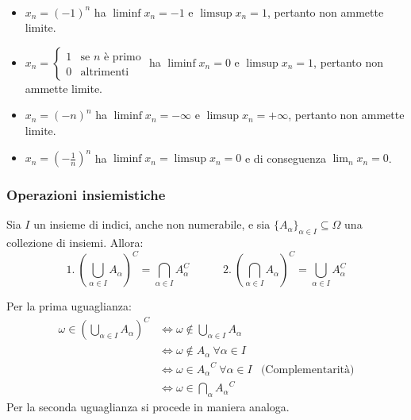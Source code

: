 \begin{ese}~\\[-12pt]
	\begin{itemize}	
		\item $x_n = (-1)^n $ ha $ \liminf x_n = -1$ e $ \limsup x_n = 1$, pertanto non ammette limite.
		\item $x_n = \begin{cases}
		1 & \text{se } n \text{ è primo} \\
		0 & \text{altrimenti}
		\end{cases}$ ha $ \liminf x_n = 0$ e $ \limsup x_n = 1$, pertanto non ammette limite.
		\item $x_n = (-n)^n $ ha $ \liminf x_n = -\infty$ e $ \limsup x_n = +\infty$, pertanto non ammette limite.
		\item $x_n = (-\frac{1}{n})^n $ ha $ \liminf x_n = \limsup x_n = 0$ e di conseguenza $\lim_{n}x_n =0$.
		
		
	\end{itemize}
\end{ese}
\subsubsection{Operazioni insiemistiche}
\begin{teo}
	Sia $I$ un insieme di indici, anche non numerabile, e sia $\{A_\alpha\}_{\alpha \in I} \subseteq \Omega$ una collezione di insiemi. Allora:
	$$
		\text{1.} \ \left(\bigcup_{\alpha \in I} A_\alpha \right)^C = \bigcap_{\alpha \in I} A_\alpha^C
		\qquad\quad \text{2.} \ \left(\bigcap_{\alpha \in I} A_\alpha \right)^C = \bigcup_{\alpha \in I} A_\alpha^C
	$$
\end{teo}
\begin{dimo}
	\begin{enumerate}
		Per la prima uguaglianza:
		\begin{align*}
		\omega \in \left(\bigcup_{\alpha \in I}A_\alpha \right)^C 
		&\iff \omega \notin \bigcup_{\alpha \in I}A_\alpha & \\
		&\iff \omega \notin A_\alpha \ \forall \alpha \in I & \\
		&\iff \omega \in{A_\alpha}^C \ \forall \alpha \in I & \text{(Complementarità)}\\
		&\iff \omega \in \bigcap_{\alpha}{A_\alpha}^C &
		\end{align*}
	    Per la seconda uguaglianza si procede in maniera analoga. \qedhere
	\end{enumerate}
\end{dimo}

